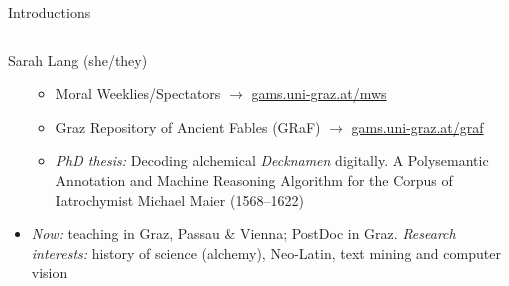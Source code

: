 \begin{frame}{Introductions}
\begin{columns}[T,onlytextwidth]
\begin{block}{Sarah Lang (she/they)}
\begin{itemize}
          \begin{itemize}\scriptsize
              \item Moral Weeklies/Spectators $\to$ \protect\url{gams.uni-graz.at/mws}
              \item Graz Repository of Ancient Fables (GRaF) $\to$ \protect\url{gams.uni-graz.at/graf}
              \item \emph{PhD thesis:} Decoding alchemical \emph{Decknamen} digitally. A Polysemantic Annotation and Machine Reasoning Algorithm for the Corpus of Iatrochymist Michael Maier (1568--1622)
          \end{itemize}
          \item \emph{Now:} teaching in Graz, Passau \& Vienna; PostDoc in Graz. \emph{Research interests:} history of science (alchemy), Neo-Latin, text mining and computer vision
      \end{itemize}
      \end{block}
  \end{columns}
\end{frame}

